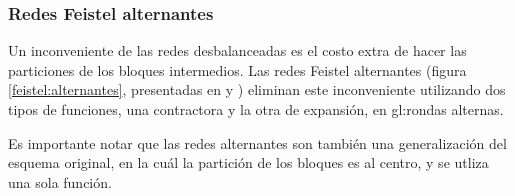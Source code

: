 %
%

\subsubsection{Redes Feistel alternantes}

Un inconveniente de las redes desbalanceadas es el costo extra de hacer las
particiones de los bloques intermedios. Las redes Feistel alternantes
(figura \ref{feistel:alternantes}, presentadas en
\cite{DBLP:conf/fse/AndersonB96a} y \cite{DBLP:conf/fse/Lucks96}) eliminan
este inconveniente utilizando dos tipos de funciones, una contractora y la
otra de expansión, en \glspl{gl:ronda} alternas.

Es importante notar que las redes alternantes son también una generalización
del esquema original, en la cuál la partición de los bloques es al centro, y
se utliza una sola función.

